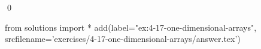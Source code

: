 
\begin{ex}
  \label{ex:4-17-one-dimensional-arrays}
  
  \qed
\end{ex}
\begin{python0}
from solutions import *
add(label="ex:4-17-one-dimensional-arrays",
    srcfilename='exercises/4-17-one-dimensional-arrays/answer.tex')
\end{python0}
